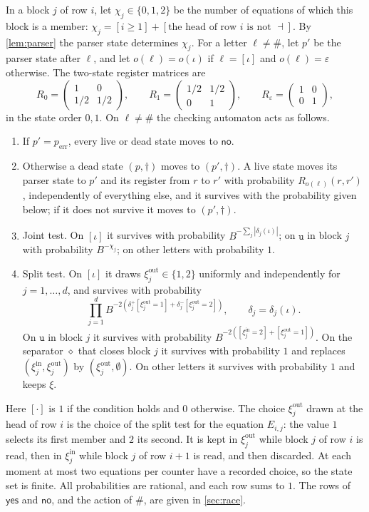 \documentclass[11pt]{article}
\theoremstyle{plain}
\theoremstyle{definition}
\theoremstyle{remark}
\newcommand{\eps}{\varepsilon}
\newcommand{\yes}{\mathsf{yes}}
\newcommand{\no}{\mathsf{no}}
\newcommand{\dead}{\dagger}
\newcommand{\un}{\mathtt{u}}
\newcommand{\fin}{\dashv}
\newcommand{\perr}{p_{\mathrm{err}}}
\begin{document}
In a block $j$ of row $i$, let $\chi_j\in\{0,1,2\}$ be the number of equations of which this block is a member: $\chi_j=[i\ge1]+[\text{the head of row $i$ is not $\fin$}]$. By \cref{lem:parser} the parser state determines $\chi_j$. For a letter $\ell\ne\#$, let $p'$ be the parser state after $\ell$, and let $o(\ell)=o(\iota)$ if $\ell=[\iota]$ and $o(\ell)=\eps$ otherwise. The two-state register matrices are
\[
R_0=\begin{pmatrix}1&0\\ 1/2&1/2\end{pmatrix},\qquad R_1=\begin{pmatrix}1/2&1/2\\ 0&1\end{pmatrix},\qquad R_\eps=\begin{pmatrix}1&0\\0&1\end{pmatrix},
\]
in the state order $0,1$. On $\ell\ne\#$ the checking automaton acts as follows.
\begin{enumerate}[label=(C\arabic*)]
\item If $p'=\perr$, every live or dead state moves to $\no$.
\item Otherwise a dead state $(p,\dead)$ moves to $(p',\dead)$. A live state moves its parser state to $p'$ and its register from $r$ to $r'$ with probability $R_{o(\ell)}(r,r')$, independently of everything else, and it survives with the probability given below; if it does not survive it moves to $(p',\dead)$.
\item Joint test. On $[\iota]$ it survives with probability $B^{-\sum_j|\delta_j(\iota)|}$; on $\un$ in block $j$ with probability $B^{-\chi_j}$; on other letters with probability $1$.
\item Split test. On $[\iota]$ it draws $\xi^{\mathrm{out}}_j\in\{1,2\}$ uniformly and independently for $j=1,\dots,d$, and survives with probability
\[
\prod_{j=1}^dB^{-2\left(\delta_j^+[\xi^{\mathrm{out}}_j=1]+\delta_j^-[\xi^{\mathrm{out}}_j=2]\right)},\qquad \delta_j=\delta_j(\iota).
\]
On $\un$ in block $j$ it survives with probability $B^{-2([\xi^{\mathrm{in}}_j=2]+[\xi^{\mathrm{out}}_j=1])}$. On the separator $\diamond$ that closes block $j$ it survives with probability $1$ and replaces $(\xi^{\mathrm{in}}_j,\xi^{\mathrm{out}}_j)$ by $(\xi^{\mathrm{out}}_j,\emptyset)$. On other letters it survives with probability $1$ and keeps $\xi$.
\end{enumerate}
Here $[\cdot]$ is $1$ if the condition holds and $0$ otherwise. The choice $\xi^{\mathrm{out}}_j$ drawn at the head of row $i$ is the choice of the split test for the equation $E_{i,j}$: the value $1$ selects its first member and $2$ its second. It is kept in $\xi^{\mathrm{out}}_j$ while block $j$ of row $i$ is read, then in $\xi^{\mathrm{in}}_j$ while block $j$ of row $i+1$ is read, and then discarded. At each moment at most two equations per counter have a recorded choice, so the state set is finite. All probabilities are rational, and each row sums to $1$. The rows of $\yes$ and $\no$, and the action of $\#$, are given in \cref{sec:race}.
\end{document}
